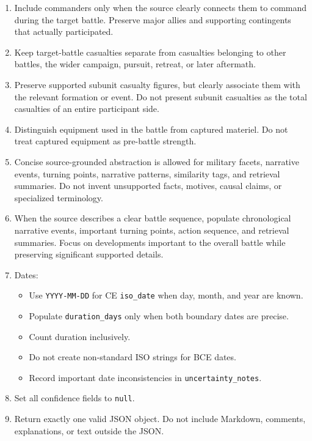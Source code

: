 \begin{enumerate}[
    leftmargin=1.2cm,
    itemsep=5pt,
    topsep=3pt,
    parsep=0pt,
    label=\textbf{\arabic*.}
]
    \item Include commanders only when the source clearly connects them to command during the target battle. Preserve major allies and supporting contingents that actually participated.

    \item Keep target-battle casualties separate from casualties belonging to other battles, the wider campaign, pursuit, retreat, or later aftermath.

    \item Preserve supported subunit casualty figures, but clearly associate them with the relevant formation or event. Do not present subunit casualties as the total casualties of an entire participant side.

    \item Distinguish equipment used in the battle from captured materiel. Do not treat captured equipment as pre-battle strength.

    \item Concise source-grounded abstraction is allowed for military facets, narrative events, turning points, narrative patterns, similarity tags, and retrieval summaries. Do not invent unsupported facts, motives, causal claims, or specialized terminology.

    \item When the source describes a clear battle sequence, populate chronological narrative events, important turning points, action sequence, and retrieval summaries. Focus on developments important to the overall battle while preserving significant supported details.

    \item Dates:
    \begin{itemize}[
        leftmargin=1.5em,
        itemsep=2pt,
        topsep=3pt,
        parsep=0pt
    ]
        \item Use \texttt{YYYY-MM-DD} for CE \texttt{iso\_date} when day, month, and year are known.
        \item Populate \texttt{duration\_days} only when both boundary dates are precise.
        \item Count duration inclusively.
        \item Do not create non-standard ISO strings for BCE dates.
        \item Record important date inconsistencies in \texttt{uncertainty\_notes}.
    \end{itemize}

    \item Set all confidence fields to \texttt{null}.

    \item Return exactly one valid JSON object. Do not include Markdown, comments, explanations, or text outside the JSON.

\end{enumerate}
\endgroup

